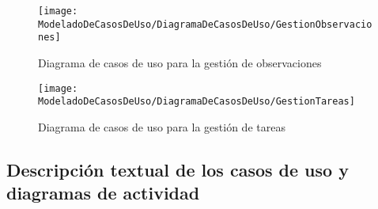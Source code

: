     \begin{figure}[H]
		\centering
		\texttt{[image: ModeladoDeCasosDeUso/DiagramaDeCasosDeUso/GestionObservaciones]}
		\caption{Diagrama de casos de uso para la gestión de observaciones}
	\label{fig:GestionObservaciones}
	\end{figure}
	\begin{figure}[H]
		\centering
		\texttt{[image: ModeladoDeCasosDeUso/DiagramaDeCasosDeUso/GestionTareas]}
		\caption{Diagrama de casos de uso para la gestión de tareas}
	\label{fig:GestionTareas}
	\end{figure}
	\clearpage %
	\subsection{Descripción textual de los casos de uso y diagramas de actividad}
